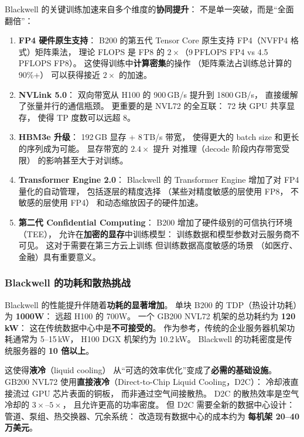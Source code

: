 Blackwell 的关键训练加速来自多个维度的\textbf{协同提升}：
不是单一突破，而是“全面翻倍”：

\begin{enumerate}[noitemsep]
  \item \textbf{FP4 硬件原生支持}：
        B200 的第五代 Tensor Core
        原生支持 FP4（NVFP4 格式）矩阵乘法，
        理论 FLOPS 是 FP8 的 $2\times$（9\,PFLOPS FP4 vs 4.5\,PFLOPS FP8）。
        这使得训练中\textbf{计算密集}的操作
        （矩阵乘法占训练总计算的 90\%+）
        可以获得接近 $2\times$ 的加速。
  \item \textbf{NVLink 5.0}：
        双向带宽从 H100 的 900\,GB/s 提升到 1800\,GB/s，
        直接缓解了张量并行的通信瓶颈。
        更重要的是 NVL72 的全互联：
        72 块 GPU 共享显存，
        使得 TP 度数可以远超 8。
  \item \textbf{HBM3e 升级}：
        192\,GB 显存 + 8\,TB/s 带宽，
        使得更大的 batch size 和更长的序列成为可能。
        显存带宽的 $2.4\times$ 提升
        对推理（decode 阶段内存带宽受限）
        的影响甚至大于对训练。
  \item \textbf{Transformer Engine 2.0}：
        Blackwell 的 Transformer Engine
        增加了对 FP4 量化的自动管理，
        包括逐层的精度选择
        （某些对精度敏感的层使用 FP8，
        不敏感的层使用 FP4）
        和动态缩放因子的硬件加速。
  \item \textbf{第二代 Confidential Computing}：
        B200 增加了硬件级别的可信执行环境（TEE），
        允许在\textbf{加密的显存}中训练模型：
        训练数据和模型参数对云服务商不可见。
        这对于需要在第三方云上训练
        但训练数据高度敏感的场景
        （如医疗、金融）具有重要意义。
\end{enumerate}

\subsubsection{Blackwell 的功耗和散热挑战}

Blackwell 的性能提升伴随着\textbf{功耗的显著增加}。
单块 B200 的 TDP（热设计功耗）为 \textbf{1000W}：
远超 H100 的 700W。
一个 GB200 NVL72 机架的总功耗约为 \textbf{120\,kW}：
这在传统数据中心中是\textbf{不可接受的}。
作为参考，传统的企业服务器机架功耗通常为 5--15\,kW，
H100 DGX 机架约为 10.2\,kW。
Blackwell 的功耗密度是传统服务器的 \textbf{10 倍以上}。

这使得\textbf{液冷}（liquid cooling）
从“可选的效率优化”变成了\textbf{必需的基础设施}。
GB200 NVL72 使用\textbf{直接液冷}（Direct-to-Chip Liquid Cooling，D2C）：
冷却液直接流过 GPU 芯片表面的铜板，
而非通过空气间接散热。
D2C 的散热效率是空气冷却的 $3\times$--$5\times$，
且允许更高的功率密度。
但 D2C 需要全新的数据中心设计：
管道、泵组、热交换器、冗余系统：
改造现有数据中心的成本约为
\textbf{每机架 20--40 万美元}。

